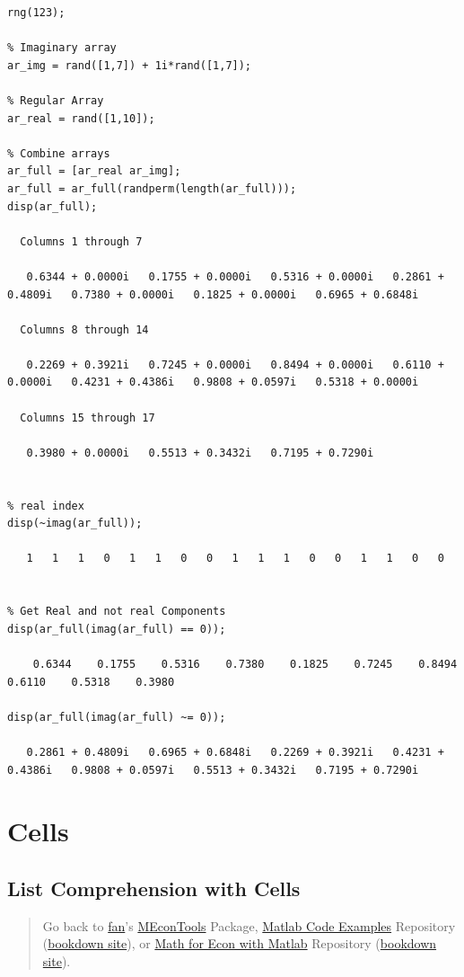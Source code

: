 \documentclass[
]{book}
\begin{document}
\begin{verbatim}
rng(123);

% Imaginary array
ar_img = rand([1,7]) + 1i*rand([1,7]);

% Regular Array
ar_real = rand([1,10]);

% Combine arrays
ar_full = [ar_real ar_img];
ar_full = ar_full(randperm(length(ar_full)));
disp(ar_full);

  Columns 1 through 7

   0.6344 + 0.0000i   0.1755 + 0.0000i   0.5316 + 0.0000i   0.2861 + 0.4809i   0.7380 + 0.0000i   0.1825 + 0.0000i   0.6965 + 0.6848i

  Columns 8 through 14

   0.2269 + 0.3921i   0.7245 + 0.0000i   0.8494 + 0.0000i   0.6110 + 0.0000i   0.4231 + 0.4386i   0.9808 + 0.0597i   0.5318 + 0.0000i

  Columns 15 through 17

   0.3980 + 0.0000i   0.5513 + 0.3432i   0.7195 + 0.7290i


% real index
disp(~imag(ar_full));

   1   1   1   0   1   1   0   0   1   1   1   0   0   1   1   0   0


% Get Real and not real Components
disp(ar_full(imag(ar_full) == 0));

    0.6344    0.1755    0.5316    0.7380    0.1825    0.7245    0.8494    0.6110    0.5318    0.3980

disp(ar_full(imag(ar_full) ~= 0));

   0.2861 + 0.4809i   0.6965 + 0.6848i   0.2269 + 0.3921i   0.4231 + 0.4386i   0.9808 + 0.0597i   0.5513 + 0.3432i   0.7195 + 0.7290i
\end{verbatim}

\hypertarget{cells}{%
\section{Cells}\label{cells}}

\hypertarget{list-comprehension-with-cells}{%
\subsection{List Comprehension with Cells}\label{list-comprehension-with-cells}}

\begin{quote}
Go back to \href{http://fanwangecon.github.io/}{fan}'s \href{https://fanwangecon.github.io/MEconTools/}{MEconTools} Package, \href{https://fanwangecon.github.io/M4Econ/}{Matlab Code Examples} Repository (\href{https://fanwangecon.github.io/M4Econ/bookdown}{bookdown site}), or \href{https://fanwangecon.github.io/Math4Econ/}{Math for Econ with Matlab} Repository (\href{https://fanwangecon.github.io/Math4Econ/bookdown}{bookdown site}).
\end{quote}
\end{document}
